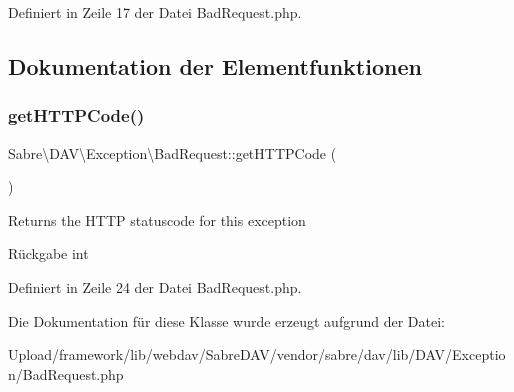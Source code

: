 Definiert in Zeile 17 der Datei Bad\+Request.\+php.



\subsection{Dokumentation der Elementfunktionen}
\mbox{\label{class_sabre_1_1_d_a_v_1_1_exception_1_1_bad_request_a9ee979b5f57c7a1bf5fef26ed0e3e677}} 
\subsubsection{\texorpdfstring{get\+H\+T\+T\+P\+Code()}{getHTTPCode()}}
{\footnotesize\ttfamily Sabre\textbackslash{}\+D\+A\+V\textbackslash{}\+Exception\textbackslash{}\+Bad\+Request\+::get\+H\+T\+T\+P\+Code (\begin{DoxyParamCaption}{ }\end{DoxyParamCaption})}

Returns the H\+T\+TP statuscode for this exception

\begin{DoxyReturn}{Rückgabe}
int 
\end{DoxyReturn}


Definiert in Zeile 24 der Datei Bad\+Request.\+php.



Die Dokumentation für diese Klasse wurde erzeugt aufgrund der Datei\+:\begin{DoxyCompactItemize}
\item 
Upload/framework/lib/webdav/\+Sabre\+D\+A\+V/vendor/sabre/dav/lib/\+D\+A\+V/\+Exception/Bad\+Request.\+php\end{DoxyCompactItemize}
